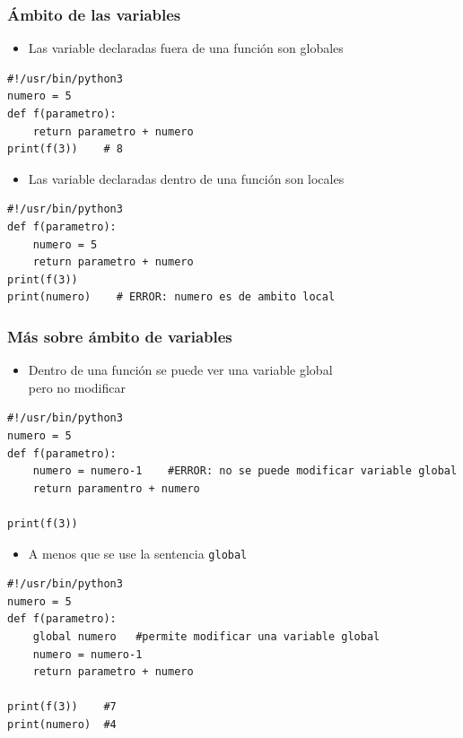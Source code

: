 \documentclass{beamer}
\begin{document}
\begin{frame}[fragile]
\frametitle{Ámbito de las variables}
\begin{itemize}
\item 
Las variable declaradas fuera de una función son globales
\end{itemize}
  \begin{footnotesize}
\begin{verbatim}
#!/usr/bin/python3
numero = 5
def f(parametro):
    return parametro + numero
print(f(3))    # 8
\end{verbatim}
  \end{footnotesize}

\begin{itemize}
\item 
Las variable declaradas dentro de una función son locales
\end{itemize}

  \begin{footnotesize}
\begin{verbatim}
#!/usr/bin/python3
def f(parametro):
    numero = 5
    return parametro + numero
print(f(3))
print(numero)    # ERROR: numero es de ambito local
\end{verbatim}
  \end{footnotesize}


\end{frame}


\begin{frame}[fragile]
\frametitle{Más sobre ámbito de variables}

\begin{itemize}
\item 
Dentro de una función se puede ver una variable global\\
pero no modificar
\end{itemize}
  \begin{footnotesize}
\begin{verbatim}
#!/usr/bin/python3
numero = 5
def f(parametro):
    numero = numero-1    #ERROR: no se puede modificar variable global
    return paramentro + numero
    
print(f(3))
\end{verbatim}
  \end{footnotesize}

\begin{itemize}
\item 
A menos que se use la sentencia \verb|global|
\end{itemize}



  \begin{footnotesize}
\begin{verbatim}
#!/usr/bin/python3
numero = 5
def f(parametro):
    global numero   #permite modificar una variable global
    numero = numero-1   
    return parametro + numero
    
print(f(3))    #7
print(numero)  #4
\end{verbatim}
  \end{footnotesize}


\end{frame}
\end{document}
